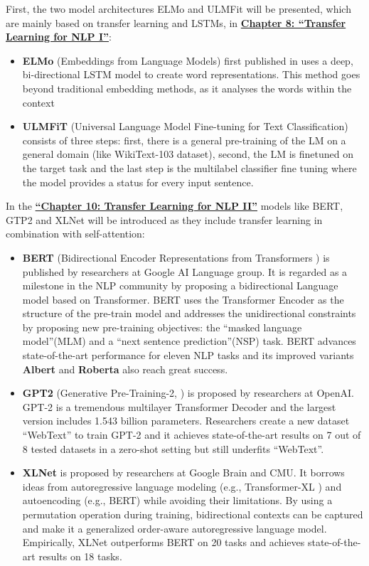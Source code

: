 \documentclass[]{krantz}
\begin{document}
First, the two model architectures ELMo and ULMFit will be presented, which are mainly based on transfer learning and LSTMs, in \protect\hyperlink{Transfer-Learning-for-NLP-I}{\textbf{Chapter 8: ``Transfer Learning for NLP I''}}:

\begin{itemize}
\item
  \textbf{ELMo} (Embeddings from Language Models) first published in \citet{elmopaper} uses a deep, bi-directional LSTM model to create word representations. This method goes beyond traditional embedding methods, as it analyses the words within the context
\item
  \textbf{ULMFiT} (Universal Language Model Fine-tuning for Text Classification) consists of three steps: first, there is a general pre-training of the LM on a general domain (like WikiText-103 dataset), second, the LM is finetuned on the target task and the last step is the multilabel classifier fine tuning where the model provides a status for every input sentence.
\end{itemize}

In the \protect\hyperlink{Transfer-Learning-for-NLP-II}{\textbf{``Chapter 10: Transfer Learning for NLP II''}} models like BERT, GTP2 and XLNet will be introduced as they include transfer learning in combination with self-attention:

\begin{itemize}
\item
  \textbf{BERT} (Bidirectional Encoder Representations from Transformers \citet{bert}) is published by researchers at Google AI Language group.
  It is regarded as a milestone in the NLP community by proposing a bidirectional Language model based on Transformer. BERT uses the Transformer Encoder as the structure of the pre-train model and addresses the unidirectional constraints by proposing new pre-training objectives: the ``masked language model''(MLM) and a ``next sentence prediction''(NSP) task. BERT advances state-of-the-art performance for eleven NLP tasks and its improved variants \textbf{Albert} \citet{lan2019albert} and \textbf{Roberta} \citet{liu2019roberta} also reach great success.
\item
  \textbf{GPT2} (Generative Pre-Training-2, \citet{radford2019gpt2}) is proposed by researchers at OpenAI. GPT-2 is a tremendous multilayer Transformer Decoder and the largest version includes 1.543 billion parameters. Researchers create a new dataset ``WebText'' to train GPT-2 and it achieves state-of-the-art results on 7 out of 8 tested datasets in a zero-shot setting but still underfits ``WebText''.
\item
  \textbf{XLNet} is proposed by researchers at Google Brain and CMU\citep{yang2019xlnet}. It borrows ideas from autoregressive language modeling (e.g., Transformer-XL \citet{dai2019transformer}) and autoencoding (e.g., BERT) while avoiding their limitations. By using a permutation operation during training, bidirectional contexts can be captured and make it a generalized order-aware autoregressive language model. Empirically, XLNet outperforms BERT on 20 tasks and achieves state-of-the-art results on 18 tasks.
\end{itemize}
\end{document}
